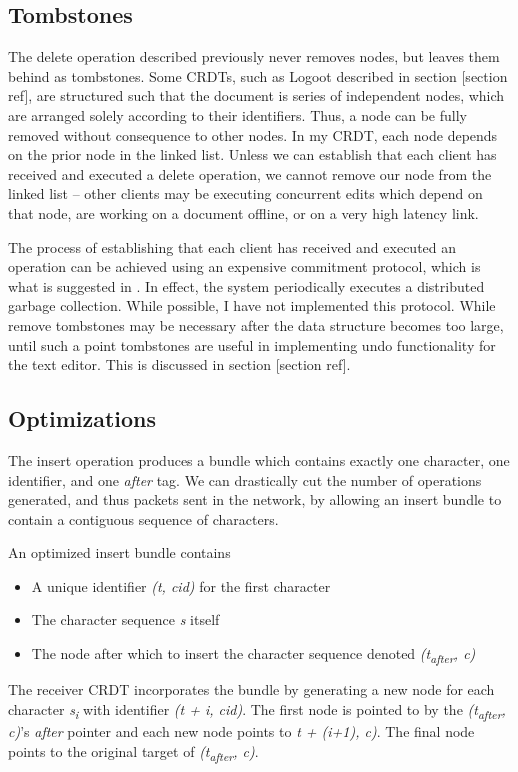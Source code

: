 \documentclass[12pt,a4paper,twoside,openright]{report}
\begin{document}
		\subsection{Tombstones}
			The delete operation described previously never removes nodes, but leaves them behind as tombstones. Some CRDTs, such as Logoot described in section [section ref], are structured such that the document is series of independent nodes, which are arranged solely according to their identifiers. Thus, a node can be fully removed without consequence to other nodes. In my CRDT, each node depends on the prior node in the linked list. Unless we can establish that each client has received and executed a delete operation, we cannot remove our node from the linked list -- other clients may be executing concurrent edits which depend on that node, are working on a document offline, or on a very high latency link.
			
			The process of establishing that each client has received and executed an operation can be achieved using an expensive commitment protocol, which is what is suggested in \cite{preguica2009}. In effect, the system periodically executes a distributed garbage collection. While possible, I have not implemented this protocol. While remove tombstones may be necessary after the data structure becomes too large, until such a point tombstones are useful in implementing undo functionality for the text editor. This is discussed in section [section ref].
		
		\subsection{Optimizations}
			The insert operation produces a bundle which contains exactly one character, one identifier, and one \textit{after} tag. We can drastically cut the number of operations generated, and thus packets sent in the network, by allowing an insert bundle to contain a contiguous sequence of characters. 
			
			An optimized insert bundle contains
			\begin{itemize}
				\item A unique identifier  \textit{(t, cid)} for the first character
				\item The character sequence \textit{s} itself
				\item The node after which to insert the character sequence denoted \textit{(t\textsubscript{after}, c)}
			\end{itemize}
			The receiver CRDT incorporates the bundle by generating a new node for each character \textit{s\textsubscript{i}} with identifier \textit{(t + i, cid)}. The first node is pointed to by the \textit{(t\textsubscript{after}, c)}'s \textit{after} pointer and each new node points to \textit{t + (i+1), c)}. The final node points to the original target of \textit{(t\textsubscript{after}, c)}.
			
\end{document}
